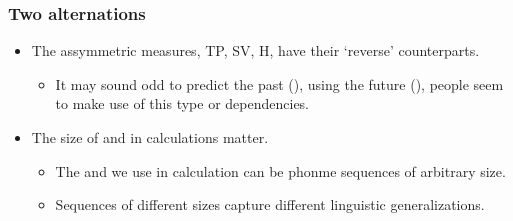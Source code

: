\begin{frame}
\frametitle{Two alternations}

\begin{itemize}
\item The assymmetric measures, TP, SV, H,  have their `reverse'
        counterparts.\\
      \begin{itemize}
      \item It may sound odd to predict the past (\xL), using the
            future (\xR), people seem to make use of this type or
            dependencies.
      \end{itemize}
\item The size of \xL{} and \xR{} in calculations matter.
    \begin{itemize}
    \item The \xL{} and \xR{} we use in calculation can be phonme 
      sequences of arbitrary size.
    \item Sequences of different sizes capture different linguistic
      generalizations.
    \end{itemize}
\end{itemize}

\end{frame}
